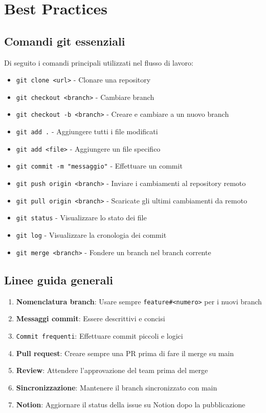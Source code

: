 \section{Best Practices}

\subsection{Comandi git essenziali}

Di seguito i comandi principali utilizzati nel flusso di lavoro:

\begin{itemize}
  \item \texttt{git clone <url>} - Clonare una repository
  \item \texttt{git checkout <branch>} - Cambiare branch
  \item \texttt{git checkout -b <branch>} - Creare e cambiare a un nuovo branch
  \item \texttt{git add .} - Aggiungere tutti i file modificati
  \item \texttt{git add <file>} - Aggiungere un file specifico
  \item \texttt{git commit -m "messaggio"} - Effettuare un commit
  \item \texttt{git push origin <branch>} - Inviare i cambiamenti al repository remoto
  \item \texttt{git pull origin <branch>} - Scaricate gli ultimi cambiamenti da remoto
  \item \texttt{git status} - Visualizzare lo stato dei file
  \item \texttt{git log} - Visualizzare la cronologia dei commit
  \item \texttt{git merge <branch>} - Fondere un branch nel branch corrente
\end{itemize}

\subsection{Linee guida generali}

\begin{enumerate}
  \item \textbf{Nomenclatura branch}: Usare sempre \texttt{feature\#<numero>} per i nuovi branch
  \item \textbf{Messaggi commit}: Essere descrittivi e concisi
  \item \texttt{Commit frequenti}: Effettuare commit piccoli e logici
  \item \textbf{Pull request}: Creare sempre una PR prima di fare il merge su main
  \item \textbf{Review}: Attendere l'approvazione del team prima del merge
  \item \textbf{Sincronizzazione}: Mantenere il branch sincronizzato con main
  \item \textbf{Notion}: Aggiornare il status della issue su Notion dopo la pubblicazione
\end{enumerate}

